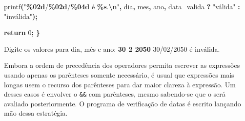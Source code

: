 \documentclass[
  11pt,
  a4paper,
]{scrbook}
\newenvironment{Shaded}{\begin{snugshade}}{\end{snugshade}}
\newcommand{\ControlFlowTok}[1]{\textcolor[rgb]{0.13,0.29,0.53}{\textbf{#1}}}
\newcommand{\DecValTok}[1]{\textcolor[rgb]{0.00,0.00,0.81}{#1}}
\newcommand{\KeywordTok}[1]{\textcolor[rgb]{0.13,0.29,0.53}{\textbf{#1}}}
\newcommand{\NormalTok}[1]{#1}
\newcommand{\OperatorTok}[1]{\textcolor[rgb]{0.81,0.36,0.00}{\textbf{#1}}}
\newcommand{\SpecialCharTok}[1]{\textcolor[rgb]{0.81,0.36,0.00}{\textbf{#1}}}
\newcommand{\StringTok}[1]{\textcolor[rgb]{0.31,0.60,0.02}{#1}}
\begin{document}
\begin{Shaded}
\begin{Highlighting}[]
\NormalTok{    printf}\OperatorTok{(}\StringTok{"}\SpecialCharTok{\%02d}\StringTok{/}\SpecialCharTok{\%02d}\StringTok{/}\SpecialCharTok{\%04d}\StringTok{ é }\SpecialCharTok{\%s}\StringTok{.}\SpecialCharTok{\textbackslash{}n}\StringTok{"}\OperatorTok{,}\NormalTok{ dia}\OperatorTok{,}\NormalTok{ mes}\OperatorTok{,}\NormalTok{ ano}\OperatorTok{,} 
\NormalTok{        data\_valida }\OperatorTok{?} \StringTok{"válida"} \OperatorTok{:} \StringTok{"inválida"}\OperatorTok{);}

    \ControlFlowTok{return} \DecValTok{0}\OperatorTok{;}
\OperatorTok{\}}
\end{Highlighting}
\end{Shaded}

\begin{Shaded}
\begin{Highlighting}[]
\NormalTok{Digite os valores para dia, mês e ano: }\KeywordTok{ 30 2 2050 }
\NormalTok{30/02/2050 é inválida.}
\end{Highlighting}
\end{Shaded}

Embora a ordem de precedência dos operadores permita escrever as
expressões usando apenas os parênteses somente necessário, é usual que
expressões mais longas usem o recurso dos parênteses para dar maior
clareza à expressão. Um desses casos é envolver o \texttt{\&\&} com
parênteses, mesmo sabendo-se que o \texttt{\textbar{}\textbar{}} será
avaliado posteriormente. O programa de verificação de datas é escrito
lançando mão dessa estratégia.
\end{document}
